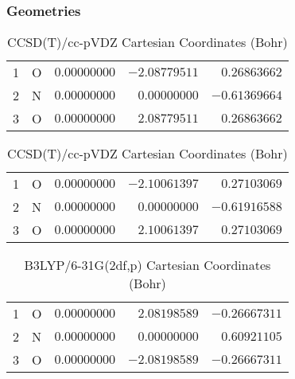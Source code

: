 \documentclass[10pt,oneside]{article}
\begin{document}
\begin{table}[h!]
\subsubsection*{Geometries}
\begin{multicols}{2}
\centering
\caption{CCSD(T)/cc-pVTZ Cartesian Coordinates (Bohr)}
\begin{tabular}{llrrr}
\toprule
1  & O  & $ 0.00000000$ & $-2.08779511$ & $ 0.26863662$ \\
2  & N  & $ 0.00000000$ & $ 0.00000000$ & $-0.61369664$ \\
3  & O  & $ 0.00000000$ & $ 2.08779511$ & $ 0.26863662$ \\
\bottomrule
\end{tabular}
\caption{CCSD(T)/cc-pVDZ Cartesian Coordinates (Bohr)}
\begin{tabular}{llrrr}
\toprule
1  & O  & $ 0.00000000$ & $-2.10061397$ & $ 0.27103069$ \\
2  & N  & $ 0.00000000$ & $ 0.00000000$ & $-0.61916588$ \\
3  & O  & $ 0.00000000$ & $ 2.10061397$ & $ 0.27103069$ \\
\bottomrule
\end{tabular}
\end{multicols}
\end{table}

\begin{table}[h]
\centering
\caption{B3LYP/6-31G(2df,p) Cartesian Coordinates (Bohr)}
\begin{tabular}{llrrr}
\toprule
1  & O  & $ 0.00000000$ & $ 2.08198589$ & $-0.26667311$ \\
2  & N  & $ 0.00000000$ & $ 0.00000000$ & $ 0.60921105$ \\
3  & O  & $ 0.00000000$ & $-2.08198589$ & $-0.26667311$ \\
\bottomrule
\end{tabular}
\end{table}
\end{document}
